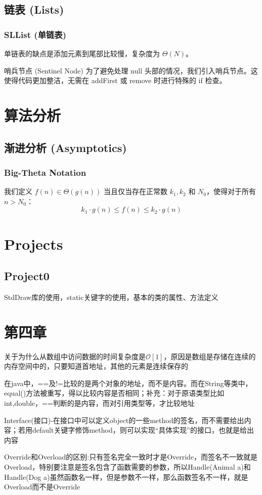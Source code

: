 \documentclass[12pt, a4paper, openany]{ctexbook} %
\newcommand{\ThetaBox}[1]{\Theta(#1)}
\begin{document}
\chapter{链表 (Lists)}
\section{SLList (单链表)}
单链表的缺点是添加元素到尾部比较慢，复杂度为 $\ThetaBox{N}$。

\begin{warning}{哨兵节点 (Sentinel Node)}
    为了避免处理 null 头部的情况，我们引入哨兵节点。这使得代码更加整洁，无需在 addFirst 或 remove 时进行特殊的 if 检查。
\end{warning}

\part{算法分析}

\chapter{渐进分析 (Asymptotics)}
\section{Big-Theta Notation}
我们定义 $f(n) \in \ThetaBox{g(n)}$ 当且仅当存在正常数 $k_1, k_2$ 和 $N_0$，使得对于所有 $n > N_0$：
$$ k_1 \cdot g(n) \le f(n) \le k_2 \cdot g(n) $$

\part{Projects}
\chapter{Project0}
StdDraw库的使用，static关键字的使用，基本的类的属性、方法定义

\part{第四章}

关于为什么从数组中访问数据的时间复杂度是$\mathcal{O}[1]$，原因是数组是存储在连续的内存空间中的，只要知道首地址，其他的元素是连续保存的\par
在java中，==及!=比较的是两个对象的地址，而不是内容。而在String等类中，equal()方法被重写，得以比较内容是否相同；补充：对于原语类型比如int,double，==判断的是内容，而对引用类型等，才比较地址\par
Interface(接口)-在接口中可以定义object的一些method的签名，而不需要给出内容；若用default关键字修饰method，则可以实现“具体实现”的接口，也就是给出内容\par
Override和Overload的区别:只有签名完全一致时才是Override，而签名不一致就是Overload，特别要注意是签名包含了函数需要的参数，所以Handle(Animal a)和Handle(Dog a)虽然函数名一样，但是参数不一样，那么函数签名不一样，就是Overload而不是Override
\end{document}
